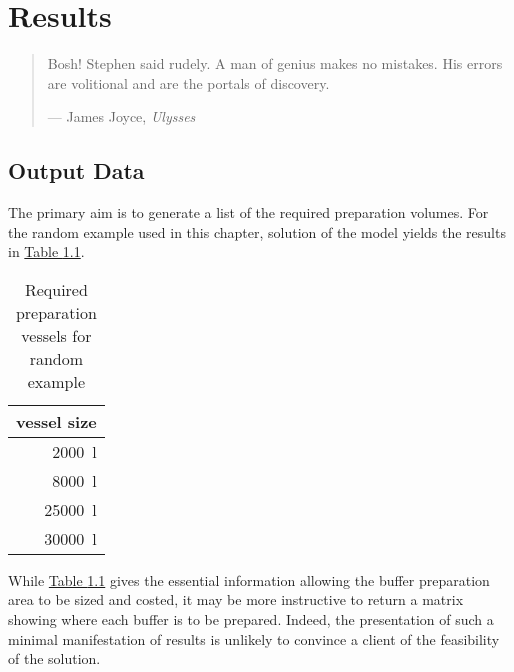 %
%
%
%

\chapter{Results}\label{C.results}

\begin{quote}
Bosh! Stephen said rudely.
A man of genius makes no mistakes.
His errors are volitional and are the portals of discovery.

\hspace{2cm}--- James Joyce, \emph{Ulysses}
\end{quote}

\section{Output Data}\label{S.outputdata}
The primary aim is to generate a list of the required preparation volumes.
For the random example used in this chapter, solution of the model yields
the results in \hyperref[tbl.reqvessels]{Table \ref*{tbl.reqvessels}}.

\begin{table}[h!]
    \centering
    \caption{Required preparation vessels for random example}
    \label{tbl.reqvessels}
    \begin{tabular}{r}
        vessel size\\ \hline
        \SI{2000}{\litre}\\
        \SI{8000}{\litre}\\
        \SI{25000}{\litre}\\
        \SI{30000}{\litre}\\
    \end{tabular}
\end{table}

While \hyperref[tbl.reqvessels]{Table \ref*{tbl.reqvessels}} gives the
essential information allowing the buffer preparation area to be sized and
costed, it may be more instructive to return a matrix showing where each buffer
is to be prepared.
Indeed, the presentation of such a minimal manifestation of results is
unlikely to convince a client of the feasibility of the solution.

